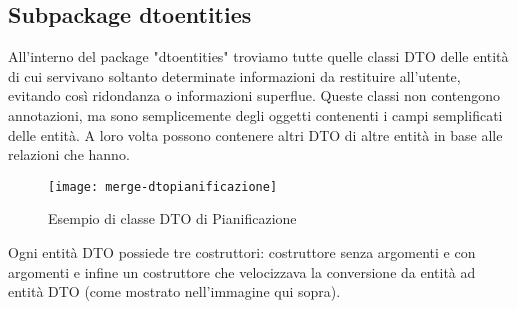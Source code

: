 \subsection{Subpackage dtoentities}
All'interno del package "dtoentities" troviamo tutte quelle classi DTO delle entità di cui servivano soltanto determinate informazioni da restituire all'utente, evitando così ridondanza o informazioni superflue. Queste classi non contengono annotazioni, ma sono semplicemente degli oggetti contenenti i campi semplificati delle entità. A loro volta possono contenere altri DTO di altre entità in base alle relazioni che hanno.
\begin{figure}[H] 
    \centering 
    \texttt{[image: merge-dtopianificazione]} 
    \caption{Esempio di classe DTO di Pianificazione}
\end{figure}
\noindent Ogni entità DTO possiede tre costruttori: costruttore senza argomenti e con argomenti e infine un costruttore che velocizzava la conversione da entità ad entità DTO (come mostrato nell'immagine qui sopra).